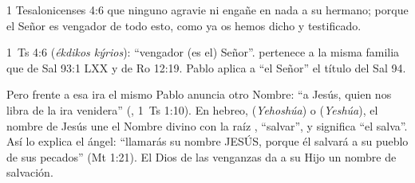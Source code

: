 \begin{verso}{1 Tesalonicenses 4:6}
que ninguno agravie ni engañe en nada a su hermano; porque el Señor es vengador de todo esto, como ya os hemos dicho y testificado.
\end{verso}

\begin{filologiatexto}{1~Ts 4:6}
 (\emph{ékdikos kýrios}): ``vengador (es el) Señor''.  pertenece a la misma familia que  de Sal 93:1 LXX y  de Ro 12:19. Pablo aplica a ``el Señor'' el título del Sal 94.
\end{filologiatexto}

Pero frente a esa ira el mismo Pablo anuncia otro Nombre: ``a Jesús, quien nos libra de la ira venidera'' (, 1~Ts 1:10). En hebreo,  (\emph{Yehoshúa}) o  (\emph{Yeshúa}), el nombre de Jesús une el Nombre divino con la raíz , ``salvar'', y significa ``el \SENOR{} salva''. Así lo explica el ángel: ``llamarás su nombre JESÚS, porque él salvará a su pueblo de sus pecados'' (Mt 1:21). El Dios de las venganzas da a su Hijo un nombre de salvación.


